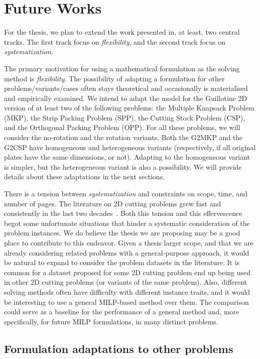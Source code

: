 \chapter{Future Works}
\label{sec:future_works}

For the thesis, we plan to extend the work presented in, at least, two central tracks.
The first track focus on \emph{flexibility}, and the second track focus on \emph{systematization}.

The primary motivation for using a mathematical formulation as the solving method is \emph{flexibility}.
The possibility of adapting a formulation for other problems/variants/cases often stays theoretical and occasionally is materialised and empirically examined.
We intend to adapt the model for the Guillotine 2D version of at least two of the following problems:
the Multiple Knapsack Problem (MKP), the Strip Packing Problem (SPP), the Cutting Stock Problem (CSP), and the Orthogonal Packing Problem (OPP).
For all these problems, we will consider the no-rotation and the rotation variants.
Both the G2MKP and the G2CSP have homogeneous and heterogeneous variants (respectively, if all original plates have the same dimensions, or not).
Adapting to the homogeneous variant is simpler, but the heterogeneous variant is also a possibility.
We will provide details about these adaptations in the next sections.

There is a tension between \emph{systematization} and constraints on scope, time, and number of pages.
The literature on 2D cutting problems grew fast and consistently in the last two decades~\citep{iori:2020}.
Both this tension and this effervescence begot some unfortunate situations that hinder a systematic consideration of the problem instances.
We do believe the thesis we are proposing may be a good place to contribute to this endeavor.
Given a thesis larger scope, and that we are already considering related problems with a general-purpose approach, it would be natural to expand to consider the problem datasets in the literature.
It is common for a dataset proposed for some 2D cutting problem end up being used in other 2D cutting problems (or variants of the same problem).
Also, different solving methods often have difficulty with different instance traits, and it would be interesting to use a general MILP-based method over them.
The comparison could serve as a baseline for the performance of a general method and, more specifically, for future MILP formulations, in many distinct problems.

\section{Formulation adaptations to other problems}
\label{sec:formulation_adaptation}

